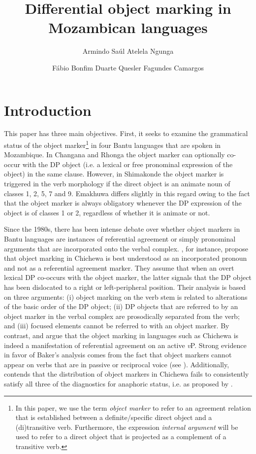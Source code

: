 \documentclass[output=paper]{langsci/langscibook}
\title{Differential object marking in Mozambican languages}
\author{%
Armindo Saúl Atelela Ngunga\affiliation{University of Eduardo Mondlane}\and 
Fábio Bonfim Duarte\affiliation{Federal University of Minas Gerais}\lastand 
 Quesler Fagundes Camargos \affiliation{Federal University of Rondônia}
}
\begin{document}
 
 
 

\section{Introduction}

This paper has three main objectives. First, it seeks to examine the grammatical status of the object marker\footnote{ {In this paper, we use the term }{\textit{object marker}} {to refer to an agreement relation that is established between a definite/specific direct object and a (di)transitive verb. Furthermore, the expression }{\textit{internal argument}} {will be used to refer to a direct object that is projected as a complement of a transitive verb.}} in four Bantu languages that are spoken in Mozambique. In Changana and Rhonga the object marker can optionally co-occur with the DP object (i.e. a lexical or free pronominal expression of the object) in the same clause. However, in Shimakonde the object marker is triggered in the verb morphology if the direct object is an animate noun of classes 1, 2, 5, 7 and 9. Emakhuwa differs slightly in this regard owing to the fact that the object marker is always obligatory whenever the DP expression of the object is of classes 1 or 2, regardless of whether it is animate or not.

Since the 1980s, there has been intense debate over whether object markers in Bantu languages are instances of referential agreement or simply pronominal arguments that are incorporated onto the verbal complex. \citet{BresnanMchombo1987}, for instance, propose that object marking in Chichewa is best understood as an incorporated pronoun and not as a referential agreement marker. They assume that when an overt lexical DP co-occurs with the object marker, the latter signals that the DP object has been dislocated to a right or left-peripheral position. Their analysis is based on three arguments: 
(i) object marking on the verb stem is related to alterations of the basic order of the DP object; 
(ii) DP objects that are referred to by an object marker in the verbal complex are prosodically separated from the verb; 
and (iii) focused elements cannot be referred to with an object marker. By contrast, \citet{Baker2008} and \citet{Riedel2009} argue that the object marking in languages such as Chichewa is indeed a manifestation of referential agreement on an active {\textit{v}}P. Strong evidence in favor of Baker’s analysis comes from the fact that object markers cannot appear on verbs that are in passive or reciprocal voice (see ). Additionally, \citet{Downing2014} contends that the distribution of object markers in Chichewa fails to consistently satisfy all three of the diagnostics for anaphoric status, i.e. as proposed by \citet{BresnanMchombo1987}.
\end{document}

